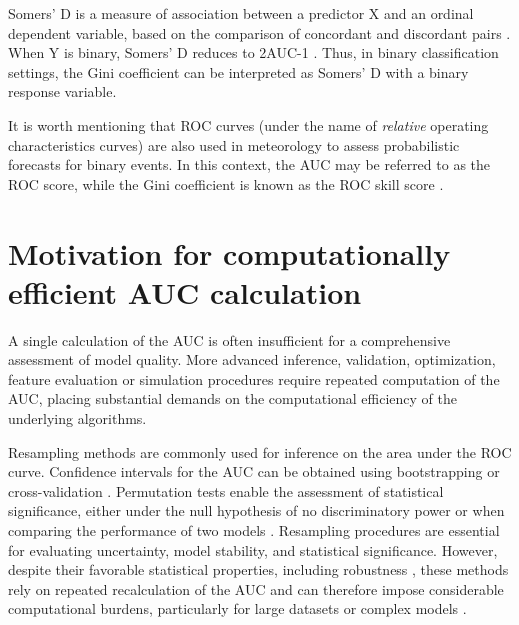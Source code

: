 Somers' D is a measure of association between a predictor X and an
ordinal dependent variable, based on the comparison of concordant and
discordant pairs \citep{Somers_1962}. When Y is binary, Somers' D reduces to
2AUC-1 \citep{Newson_2002}. Thus, in binary classification settings, the Gini
coefficient can be interpreted as Somers' D with a binary response
variable.

It is worth mentioning that ROC curves (under the name of \emph{relative}
operating characteristics curves) are also used in meteorology to assess
probabilistic forecasts for binary events. In this context, the AUC may
be referred to as the ROC score, while the Gini coefficient is known as
the ROC skill score \citep{Kharin_Zwiers_2003, Mason_Graham_1999}.

\section{Motivation for computationally efficient AUC calculation}\label{motivation-for-computationally-efficient-auc-calculation}

A single calculation of the AUC is often insufficient for a
comprehensive assessment of model quality. More advanced inference,
validation, optimization, feature evaluation or simulation procedures
require repeated computation of the AUC, placing substantial demands on
the computational efficiency of the underlying algorithms.

Resampling methods are commonly used for inference on the area under the
ROC curve. Confidence intervals for the AUC can be obtained using
bootstrapping or cross-validation \citep{Noma_Matsushima_Ishii_2021, Gu_Ghosal_Roy_2008, LeDell_Petersen_Van_Der_Laan_2015}. Permutation
tests enable the assessment of statistical significance, either under
the null hypothesis of no discriminatory power or when comparing the
performance of two models \citep{Pauly_Asendorf_Konietschke_2016, Venkatraman_2000, Bandos_Rockette_Gur_2006}. Resampling procedures are
essential for evaluating uncertainty, model stability, and statistical
significance. However, despite their favorable statistical properties,
including robustness \citep{Simonoff_Hochberg_Reiser_1986, Pauly_Asendorf_Konietschke_2016}, these methods rely on repeated
recalculation of the AUC and can therefore impose considerable
computational burdens, particularly for large datasets or complex models
\citep{LeDell_Petersen_Van_Der_Laan_2015}.

